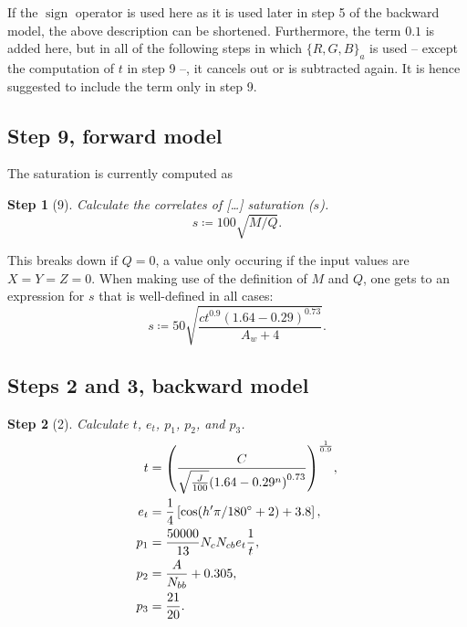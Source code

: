 \documentclass[twocolumn]{scrartcl}
\theoremstyle{named}
\newtheorem*{step}{Step}
\DeclareMathOperator{\sign}{sign}
\begin{document}
If the $\sign$ operator is used here as it is used later in step 5 of the
backward model, the above description can be shortened.
Furthermore, the term $0.1$ is added here, but in all of the following steps in
which $\{R,G,B\}_a$ is used -- except the computation of $t$ in step 9 --, it
cancels out or is subtracted again. It is hence suggested to include the term
only in step 9.

\subsection{Step 9, forward model}

The saturation is currently computed as
\begin{step}[9]
  Calculate the correlates of [\dots] saturation ($s$).
  \[
    s \coloneqq 100 \sqrt{M/Q}.
  \]
\end{step}
This breaks down if $Q=0$, a value only occuring if the input values are
$X=Y=Z=0$. When making use of the definition of $M$ and $Q$, one gets to an
expression for $s$ that is well-defined in all cases:
\[
  s \coloneqq 50 \sqrt{\frac{c t^{0.9} {(1.64-0.29)}^{0.73}}{A_w + 4}}.
\]


\subsection{Steps 2 and 3, backward model}

\begin{step}[2]
Calculate $t$, $e_t$, $p_1$, $p_2$, and $p_3$.
\begin{align*}
  t &= {\left(\frac{C}{\sqrt{\frac{J}{100}} {(1.64 - 0.29^n)}^{0.73}}\right)}^\frac{1}{0.9},\\
  e_t &= \frac{1}{4} \left[\cos(h'\pi/180\degree + 2) + 3.8\right],\\
  p_1 &= \frac{50000}{13} N_c N_{cb} e_t \frac{1}{t},\\
  p_2 &= \frac{A}{N_{bb}} + 0.305,\\
  p_3 &= \frac{21}{20}.
\end{align*}
\end{step}
\end{document}

